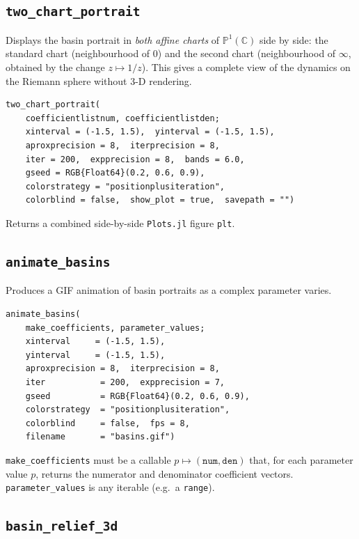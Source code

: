 \documentclass[11pt,a4paper]{article}
\theoremstyle{definition}
\newcommand{\C}{\mathbb{C}}
\newcommand{\Pone}{\mathbb{P}^1(\C)}
\newcommand{\pkg}[1]{\texttt{#1}}
\newcommand{\fn}[1]{\texttt{#1}}
\begin{document}
\subsection{\fn{two\_chart\_portrait}}

Displays the basin portrait in \emph{both affine charts} of $\Pone$
side by side: the standard chart (neighbourhood of $0$) and the second
chart (neighbourhood of $\infty$, obtained by the change $z\mapsto 1/z$).
This gives a complete view of the dynamics on the Riemann sphere without
3-D rendering.

\begin{lstlisting}
two_chart_portrait(
    coefficientlistnum, coefficientlistden;
    xinterval = (-1.5, 1.5),  yinterval = (-1.5, 1.5),
    aproxprecision = 8,  iterprecision = 8,
    iter = 200,  expprecision = 8,  bands = 6.0,
    gseed = RGB{Float64}(0.2, 0.6, 0.9),
    colorstrategy = "positionplusiteration",
    colorblind = false,  show_plot = true,  savepath = "")
\end{lstlisting}

Returns a combined side-by-side \pkg{Plots.jl} figure \texttt{plt}.

\subsection{\fn{animate\_basins}}

Produces a GIF animation of basin portraits as a complex parameter varies.

\begin{lstlisting}
animate_basins(
    make_coefficients, parameter_values;
    xinterval     = (-1.5, 1.5),
    yinterval     = (-1.5, 1.5),
    aproxprecision = 8,  iterprecision = 8,
    iter           = 200,  expprecision = 7,
    gseed          = RGB{Float64}(0.2, 0.6, 0.9),
    colorstrategy  = "positionplusiteration",
    colorblind     = false,  fps = 8,
    filename       = "basins.gif")
\end{lstlisting}

\texttt{make\_coefficients} must be a callable $p \mapsto
(\texttt{num},\texttt{den})$ that, for each parameter value $p$, returns
the numerator and denominator coefficient vectors.
\texttt{parameter\_values} is any iterable (e.g.\ a \texttt{range}).

\subsection{\fn{basin\_relief\_3d}}
\label{sec:relief3d}
\end{document}
